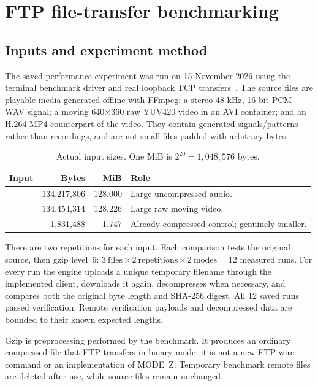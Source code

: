 \section{FTP file-transfer benchmarking}\label{sec:ftp-benchmark}

\subsection{Inputs and experiment method}
The saved performance experiment was run on 15 November 2026 using the terminal benchmark driver and real loopback TCP transfers~\cite{ftpmeasure}. The source files are playable media generated offline with FFmpeg: a stereo 48 kHz, 16-bit PCM WAV signal; a moving 640$\times$360 raw YUV420 video in an AVI container; and an H.264 MP4 counterpart of the video. They contain generated signals/patterns rather than recordings, and are not small files padded with arbitrary bytes.

\begin{table}[H]
\centering\small
\caption{Actual input sizes. One MiB is $2^{20}=1,048,576$ bytes.}
\begin{tabularx}{\linewidth}{@{}l r r Y@{}}
\toprule
Input & Bytes & MiB & Role \\
\midrule
{} & 134,217,806 & 128.000 & Large uncompressed audio. \\
 & 134,454,314 & 128.226 & Large raw moving video. \\
 & 1,831,488 & 1.747 & Already-compressed control; genuinely smaller. \\
\bottomrule
\end{tabularx}
\end{table}

There are two repetitions for each input. Each comparison tests the original source, then gzip level~6: $3\ \text{files}\times2\ \text{repetitions}\times2\ \text{modes}=12$ measured runs. For every run the engine uploads a unique temporary filename through the implemented client, downloads it again, decompresses when necessary, and compares both the original byte length and SHA-256 digest. All 12 saved runs passed verification. Remote verification payloads and decompressed data are bounded to their known expected lengths.

Gzip is preprocessing performed by the benchmark. It produces an ordinary compressed file that FTP transfers in binary mode; it is not a new FTP wire command or an implementation of MODE~Z. Temporary benchmark remote files are deleted after use, while source files remain unchanged.


